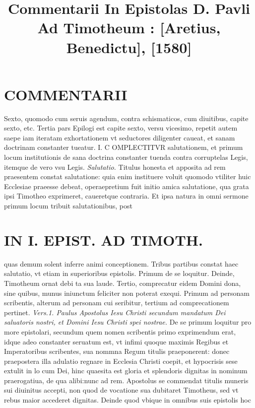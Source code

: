 \documentclass{article}
\begin{document}
\date{}
        \title{Commentarii In Epistolas D. Pavli Ad Timotheum : [Aretius, Benedictu], [1580]}
\maketitle

\begin{pages} 
\beginnumbering
        
\section*{COMMENTARII }
\marginpar{[ p.8 ]}\pstart Sexto, quomodo cum seruis agendum, contra schismaticos, cum diuitibus, capite sexto, etc.  \pend\pstart Tertia pars Epilogi est capite sexto, versu vicesimo, repetit autem saepe iam iteratam exhortationem vt seductores diligenter caueat, et sanam doctrinam constanter tueatur.  \pendCAPVT I. \pstart C OMPLECTITVR salutationem, et primum locum institutionis de sana doctrina constanter tuenda contra corruptelas Legis, itemque de vero vsu Legis.  \pend
\textit{Salutatio. }\pstart Titulus honesta et apposita ad rem praesentem constat salutatione: quia enim instituere voluit quomodo vtiliter huic Ecclesiae praeesse debeat, operaepretium fuit initio amica salutatione, qua grata ipsi Timotheo exprimeret, caueretque contraria. Et ipsa natura in omni sermone primum locum tribuit salutationibus, post  \pend
\textbf{}
\section*{IN I. EPIST. AD TIMOTH. }
\marginpar{[ p.9 ]}\pstart quas demum solent inferre animi conceptionem.  \pend\pstart Tribus partibus constat haec salutatio, vt etiam in superioribus epistolis. Primum de se loquitur. Deinde, Timotheum ornat debi ta sua laude. Tertio, comprecatur eidem Domini dona, sine quibus, munus iniunctum feliciter non poterat exequi. Primum ad personam scribentis, alterum ad personam cui seribitur, tertium ad comprecationem pertinet.  \pend
\textit{Vers.1. Paulus Apostolus Iesu Christi secundum mandatum Dei saluatoris nostri, et Domini Iesu Christi spei nostrae. }\pstart De se primum loquitur pro more epistolari, secundum quem nomen scribentis primo exprimendum erat, idque adeo constanter seruatum est, vt infimi quoque maximis Regibus et Imperatoribus scribentes, sua nommna Regum titulis praeponerent: donec praepostera illa adulatio regnare in Ecclesia Christi coepit, et hypocrisis sese extulit in lo cum Dei, hinc quaesita est gloria et splendoris dignitas in nominum praerogatiua, de qua alibi:nunc ad rem. Apostolus se commendat titulis muneris sui diuinitus accepti, non quod de vocatione sua dubitaret Timotheus, sed vt rebus maior accederet dignitas. Deinde quod vbique in omnibus suis epistolis hoc  \pend

\end{pages}
\end{document}
